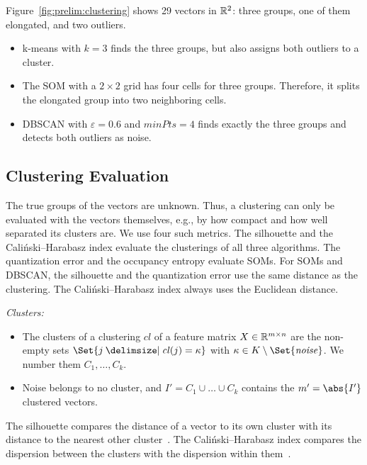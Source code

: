 \begin{example}
	\label{ex:prelim:clustering}
	Figure~\ref{fig:prelim:clustering} shows 29 vectors in $\mathbb R^2$: three groups, one of them elongated, and two outliers.
	\begin{itemize}
		\item k-means with $k = 3$ finds the three groups, but also assigns both outliers to a cluster.

		\item The SOM with a $2 \times 2$ grid has four cells for three groups. Therefore, it splits the elongated group into two neighboring cells.

		\item DBSCAN with $\varepsilon = 0.6$ and $\mathit{minPts} = 4$ finds exactly the three groups and detects both outliers as noise.
	\end{itemize}
\end{example}

\subsection{Clustering Evaluation}
\label{sec:prelim:cluster_eval}
The true groups of the vectors are unknown. Thus, a clustering can only be evaluated with the vectors themselves, e.g., by how compact and how well separated its clusters are. We use four such metrics. The silhouette and the Cali\'nski--Harabasz index evaluate the clusterings of all three algorithms. The quantization error and the occupancy entropy evaluate SOMs. For SOMs and DBSCAN, the silhouette and the quantization error use the same distance as the clustering. The Cali\'nski--Harabasz index always uses the Euclidean distance.

\medskip
\noindent\emph{Clusters:}
\begin{itemize}[beginpenalty=10000]
	\item The clusters of a clustering $\mathit{cl}$ of a feature matrix $X \in \mathbb R^{m \times n}$ are the non-empty sets $\Set{j \given \mathit{cl}(j) = \kappa}$ with $\kappa \in K \setminus \Set{\mathit{noise}}$. We number them $C_1, \dots, C_k$.
	\item Noise belongs to no cluster, and $I' = C_1 \cup \dots \cup C_k$ contains the $m' = \abs{I'}$ clustered vectors.
\end{itemize}

The silhouette compares the distance of a vector to its own cluster with its distance to the nearest other cluster~\autocite{rousseeuw1987silhouettes}. The Cali\'nski--Harabasz index compares the dispersion between the clusters with the dispersion within them~\autocite{calinski1974dendrite}.


